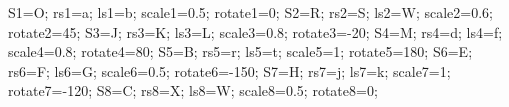 \documentclass[exercice]{thedocument}%
\begin{document}
%
    \>S1=O;%
    \>rs1=a;%
    \>ls1=b;%
    \>scale1=0.5;%
    \>rotate1=0;%
    \>S2=R;%
    \>rs2=S;%
    \>ls2=W;%
    \>scale2=0.6;%
    \>rotate2=45;%
    \>S3=J;%
    \>rs3=K;%
    \>ls3=L;%
    \>scale3=0.8;%
    \>rotate3=-20;%
    \>S4=M;%
    \>rs4=d;%
    \>ls4=f;%
    \>scale4=0.8;%
    \>rotate4=80;%
    \>S5=B;%
    \>rs5=r;%
    \>ls5=t;%
    \>scale5=1;%
    \>rotate5=180;%
    \>S6=E;%
    \>rs6=F;%
    \>ls6=G;%
    \>scale6=0.5;%
    \>rotate6=-150;%
    \>S7=H;%
    \>rs7=j;%
    \>ls7=k;%
    \>scale7=1;%
    \>rotate7=-120;%
    \>S8=C;%
    \>rs8=X;%
    \>ls8=W;%
    \>scale8=0.5;%
    \>rotate8=0;%
\end{document}
